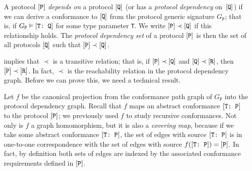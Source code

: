 \documentclass[../generics]{subfiles}
\begin{document}
\begin{definition}
A protocol $[\texttt{P}]$ \emph{depends on} a protocol $[\texttt{Q}]$ (or has a \emph{protocol dependency} on~$[\texttt{Q}]$) if we can derive a conformance to $[\texttt{Q}]$ from the protocol generic signature $G_\texttt{P}$; that is, if $G_\texttt{P}\vDash[\texttt{T:~Q}]$ for some type parameter \texttt{T}. We write $[\texttt{P}]\prec[\texttt{Q}]$ if this relationship holds. The \emph{protocol dependency set} of a protocol $[\texttt{P}]$ is then the set of all protocols $[\texttt{Q}]$ such that $[\texttt{P}]\prec[\texttt{Q}]$.
\end{definition}

 implies that $\prec$ is a transitive relation; that is, if $[\texttt{P}]\prec[\texttt{Q}]$ and $[\texttt{Q}]\prec[\texttt{R}]$, then $[\texttt{P}]\prec[\texttt{R}]$. In fact, $\prec$ is the reachability relation in the protocol dependency graph. Before we can prove this, we need a technical result.

\smallskip

Let $f$ be the canonical projection from the conformance path graph of $G_\texttt{P}$ into the protocol dependency graph. Recall that $f$ maps an abstract conformance $[\texttt{T:~P}]$ to the protocol $[\texttt{P}]$; we previously used $f$ to study recursive conformances. Not only is $f$ a graph homomorphism, but it is also a \emph{covering map}, because if we take some abstract conformance $[\texttt{T:~P}]$, the set of edges with source $[\texttt{T:~P}]$ is in one-to-one correspondence with the set of edges with source $f([\texttt{T:~P}])=[\texttt{P}]$. In fact, by definition both sets of edges are indexed by the associated conformance requirements defined in $[\texttt{P}]$.
\end{document}
